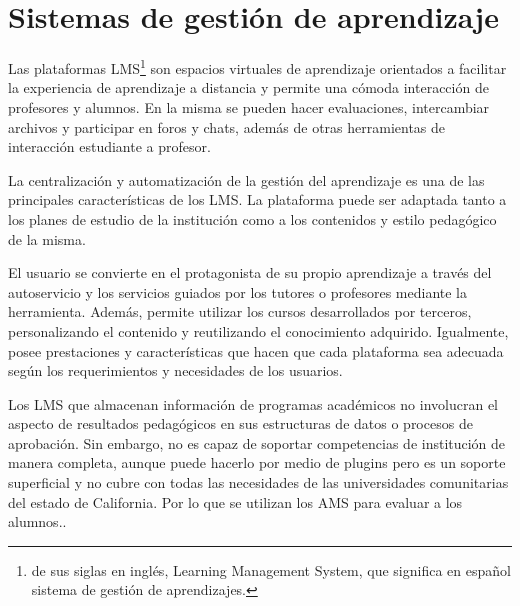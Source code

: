 \section{Sistemas de gestión de aprendizaje}
Las plataformas LMS\footnote{de sus siglas en inglés, Learning Management System, que significa en español sistema de gestión de aprendizajes.} son espacios virtuales de aprendizaje orientados a facilitar la experiencia de aprendizaje a distancia y permite una cómoda interacción de profesores y alumnos. En la misma se pueden hacer evaluaciones, intercambiar archivos y participar en foros y chats, además de otras herramientas de interacción estudiante a profesor.

La centralización y automatización de la gestión del aprendizaje es una de las principales características de los LMS. La plataforma puede ser adaptada tanto a los planes de estudio de la institución como a los contenidos y estilo pedagógico de la misma.

El usuario se convierte en el protagonista de su propio aprendizaje a través del autoservicio y los servicios guiados por los tutores o profesores mediante la herramienta. Además, permite utilizar los cursos desarrollados por terceros, personalizando el contenido y reutilizando el conocimiento adquirido. Igualmente, posee prestaciones y características que hacen que cada plataforma sea adecuada según los requerimientos y necesidades de los usuarios.

Los LMS que almacenan información de programas académicos no involucran el aspecto de resultados pedagógicos en sus estructuras de datos o procesos de aprobación. Sin embargo, no es capaz de soportar competencias de institución de manera completa, aunque puede hacerlo por medio de plugins pero es un soporte superficial y no cubre con todas las necesidades de las universidades comunitarias del estado de California. Por lo que se utilizan los AMS para evaluar a los alumnos.\citep{aalst_workflow_2004}.